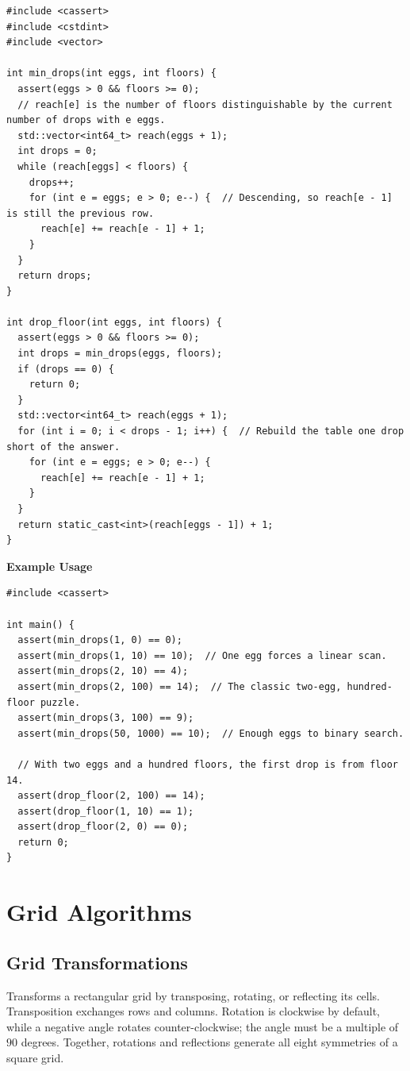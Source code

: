 \begin{lstlisting}[style=cpp]
#include <cassert>
#include <cstdint>
#include <vector>

int min_drops(int eggs, int floors) {
  assert(eggs > 0 && floors >= 0);
  // reach[e] is the number of floors distinguishable by the current number of drops with e eggs.
  std::vector<int64_t> reach(eggs + 1);
  int drops = 0;
  while (reach[eggs] < floors) {
    drops++;
    for (int e = eggs; e > 0; e--) {  // Descending, so reach[e - 1] is still the previous row.
      reach[e] += reach[e - 1] + 1;
    }
  }
  return drops;
}

int drop_floor(int eggs, int floors) {
  assert(eggs > 0 && floors >= 0);
  int drops = min_drops(eggs, floors);
  if (drops == 0) {
    return 0;
  }
  std::vector<int64_t> reach(eggs + 1);
  for (int i = 0; i < drops - 1; i++) {  // Rebuild the table one drop short of the answer.
    for (int e = eggs; e > 0; e--) {
      reach[e] += reach[e - 1] + 1;
    }
  }
  return static_cast<int>(reach[eggs - 1]) + 1;
}
\end{lstlisting}
\textbf{Example Usage}\par
\begin{lstlisting}[style=cpp]
#include <cassert>

int main() {
  assert(min_drops(1, 0) == 0);
  assert(min_drops(1, 10) == 10);  // One egg forces a linear scan.
  assert(min_drops(2, 10) == 4);
  assert(min_drops(2, 100) == 14);  // The classic two-egg, hundred-floor puzzle.
  assert(min_drops(3, 100) == 9);
  assert(min_drops(50, 1000) == 10);  // Enough eggs to binary search.

  // With two eggs and a hundred floors, the first drop is from floor 14.
  assert(drop_floor(2, 100) == 14);
  assert(drop_floor(1, 10) == 1);
  assert(drop_floor(2, 0) == 0);
  return 0;
}
\end{lstlisting}

\section{\texorpdfstring{Grid Algorithms}{1.4 Grid Algorithms}}
\setcounter{section}{4}
\setcounter{subsection}{0}
\subsection{Grid Transformations}
\label{sec:1.4.1}
Transforms a rectangular grid by transposing, rotating, or reflecting its cells. Transposition exchanges rows and columns. Rotation is clockwise by default, while a negative angle rotates counter-clockwise; the angle must be a multiple of $90$ degrees. Together, rotations and reflections generate all eight symmetries of a square grid.

